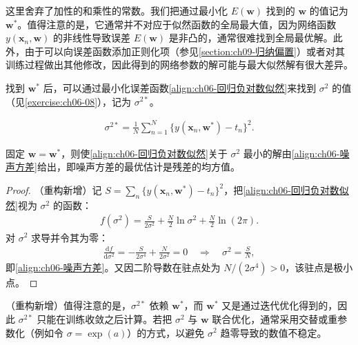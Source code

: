 \documentclass[../../main.tex]{subfiles}
\begin{document}
这里舍弃了加性的和乘性的常数。我们把通过最小化 $E(\boldsymbol{w})$ 找到的 $\boldsymbol{w}$ 的值记为 $\boldsymbol{w}^{\ast}$。值得注意的是，它通常并不对应于似然函数的全局最大值，因为网络函数 $y(\boldsymbol{x}_n,\boldsymbol{w})$ 的非线性导致误差 $E(\boldsymbol{w})$ 是非凸的，通常很难找到全局最优解。此外，由于可以向误差函数添加正则化项（参见\cref{section:ch09-归纳偏置}）或者对其训练过程做出其他修改，因此得到的网络参数的解可能与最大似然解有很大差异。

找到 $\boldsymbol{w}^{\ast}$ 后，可以通过最小化误差函数\eqref{align:ch06-回归负对数似然}来找到 $\sigma^{2}$ 的值（见\cref{exercise:ch06-08}），记为 $\sigma^{2\ast}$。

\begin{align}
\sigma^{2\ast}=\frac{1}{N}\sum_{n=1}^{N}\bigl\{y(\boldsymbol{x}_n,\boldsymbol{w}^{\ast})-t_n\bigr\}^{2}.
\label{align:ch06-噪声方差}
\end{align}

\begin{proposition}[噪声方差的最大似然解]\label{proposition:ch06-噪声方差估计}
固定 $\boldsymbol{w}=\boldsymbol{w}^{\ast}$，则使\eqref{align:ch06-回归负对数似然}关于 $\sigma^{2}$ 最小的解由\eqref{align:ch06-噪声方差}给出，即噪声方差的最优估计是残差的均方值。
\end{proposition}

\begin{proof}
（重构新增）记 $S=\sum_{n}\{y(\boldsymbol{x}_n,\boldsymbol{w}^{\ast})-t_n\}^{2}$，把\eqref{align:ch06-回归负对数似然}视为 $\sigma^{2}$ 的函数：
\begin{align}
f(\sigma^{2})=\frac{S}{2\sigma^{2}}+\frac{N}{2}\ln\sigma^{2}+\frac{N}{2}\ln(2\pi).
\end{align}
对 $\sigma^{2}$ 求导并令其为零：
\begin{align}
\frac{\mathrm{d}f}{\mathrm{d}\sigma^{2}}=-\frac{S}{2\sigma^{4}}+\frac{N}{2\sigma^{2}}=0
\quad\Longrightarrow\quad \sigma^{2}=\frac{S}{N},
\end{align}
即\eqref{align:ch06-噪声方差}。又因二阶导数在驻点处为 $N/(2\sigma^{4})>0$，该驻点是极小点。
\end{proof}

\begin{remark}（重构新增）值得注意的是，$\sigma^{2\ast}$ 依赖 $\boldsymbol{w}^{\ast}$，而 $\boldsymbol{w}^{\ast}$ 又是通过迭代优化得到的，因此 $\sigma^{2\ast}$ 只能在训练收敛之后计算。若把 $\sigma^{2}$ 与 $\boldsymbol{w}$ 联合优化，通常采用交替或重参数化（例如令 $\sigma=\exp(a)$）的方式，以避免 $\sigma^{2}$ 趋零导致的数值不稳定。
\end{remark}
\end{document}
